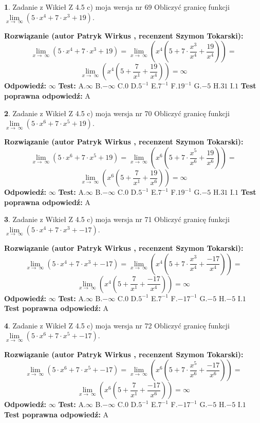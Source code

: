 \documentclass[12pt, a4paper]{article}
\theoremstyle{definition} %
\newtheorem{zad}{}
\newcommand{\zadStart}[1]{\begin{zad}#1\newline}
\newcommand{\zadStop}{\end{zad}}
\newcommand{\rozwStart}[2]{\noindent \textbf{Rozwiązanie (autor #1 , recenzent #2): }\newline}
\newcommand{\rozwStop}{\newline}
\newcommand{\odpStart}{\noindent \textbf{Odpowiedź:}\newline}
\newcommand{\odpStop}{\newline}
\newcommand{\testStart}{\noindent \textbf{Test:}\newline}
\newcommand{\testStop}{\newline}
\newcommand{\kluczStart}{\noindent \textbf{Test poprawna odpowiedź:}\newline}
\newcommand{\kluczStop}{\newline}
\begin{document}
\zadStart{Zadanie z Wikieł Z 4.5 c) moja wersja nr 69}
Obliczyć granicę funkcji  $\lim\limits_{x\to\ \infty}(5 \cdot x^{4}+7 \cdot x^{3}+19)$.
\zadStop
\rozwStart{Patryk Wirkus}{Szymon Tokarski}
$$\lim\limits_{x\to\ \infty}(5 \cdot x^{4}+7 \cdot x^{3}+19) = \lim\limits_{x\to\ \infty}(x^{4}(5 +7 \cdot \frac{x^{3}}{x^{4}}+\frac{19}{x^{4}})) =$$ $$\lim\limits_{x\to\ \infty}(x^{4}(5 +\frac{7}{x^{1}}+\frac{19}{x^{4}})) =\infty$$
\rozwStop
\odpStart
$\infty$
\odpStop
\testStart
A.$\infty$ B.$-\infty$ C.$0$ D.$5^{-1}$ E.$7^{-1}$
F.$19^{-1}$ G.$-5$
H.$31$
I.$1$
\testStop
\kluczStart
A
\kluczStop



\zadStart{Zadanie z Wikieł Z 4.5 c) moja wersja nr 70}
Obliczyć granicę funkcji  $\lim\limits_{x\to\ \infty}(5 \cdot x^{6}+7 \cdot x^{5}+19)$.
\zadStop
\rozwStart{Patryk Wirkus}{Szymon Tokarski}
$$\lim\limits_{x\to\ \infty}(5 \cdot x^{6}+7 \cdot x^{5}+19) = \lim\limits_{x\to\ \infty}(x^{6}(5 +7 \cdot \frac{x^{5}}{x^{6}}+\frac{19}{x^{6}})) =$$ $$\lim\limits_{x\to\ \infty}(x^{6}(5 +\frac{7}{x^{1}}+\frac{19}{x^{6}})) =\infty$$
\rozwStop
\odpStart
$\infty$
\odpStop
\testStart
A.$\infty$ B.$-\infty$ C.$0$ D.$5^{-1}$ E.$7^{-1}$
F.$19^{-1}$ G.$-5$
H.$31$
I.$1$
\testStop
\kluczStart
A
\kluczStop



\zadStart{Zadanie z Wikieł Z 4.5 c) moja wersja nr 71}
Obliczyć granicę funkcji  $\lim\limits_{x\to\ \infty}(5 \cdot x^{4}+7 \cdot x^{3}+-17)$.
\zadStop
\rozwStart{Patryk Wirkus}{Szymon Tokarski}
$$\lim\limits_{x\to\ \infty}(5 \cdot x^{4}+7 \cdot x^{3}+-17) = \lim\limits_{x\to\ \infty}(x^{4}(5 +7 \cdot \frac{x^{3}}{x^{4}}+\frac{-17}{x^{4}})) =$$ $$\lim\limits_{x\to\ \infty}(x^{4}(5 +\frac{7}{x^{1}}+\frac{-17}{x^{4}})) =\infty$$
\rozwStop
\odpStart
$\infty$
\odpStop
\testStart
A.$\infty$ B.$-\infty$ C.$0$ D.$5^{-1}$ E.$7^{-1}$
F.$-17^{-1}$ G.$-5$
H.$-5$
I.$1$
\testStop
\kluczStart
A
\kluczStop



\zadStart{Zadanie z Wikieł Z 4.5 c) moja wersja nr 72}
Obliczyć granicę funkcji  $\lim\limits_{x\to\ \infty}(5 \cdot x^{6}+7 \cdot x^{5}+-17)$.
\zadStop
\rozwStart{Patryk Wirkus}{Szymon Tokarski}
$$\lim\limits_{x\to\ \infty}(5 \cdot x^{6}+7 \cdot x^{5}+-17) = \lim\limits_{x\to\ \infty}(x^{6}(5 +7 \cdot \frac{x^{5}}{x^{6}}+\frac{-17}{x^{6}})) =$$ $$\lim\limits_{x\to\ \infty}(x^{6}(5 +\frac{7}{x^{1}}+\frac{-17}{x^{6}})) =\infty$$
\rozwStop
\odpStart
$\infty$
\odpStop
\testStart
A.$\infty$ B.$-\infty$ C.$0$ D.$5^{-1}$ E.$7^{-1}$
F.$-17^{-1}$ G.$-5$
H.$-5$
I.$1$
\testStop
\kluczStart
A
\kluczStop
\end{document}
